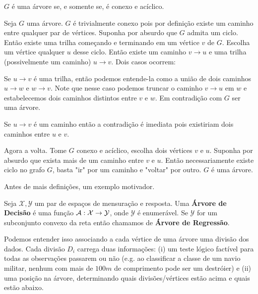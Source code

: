 \begin{teo}
$G$ é uma árvore se, e somente se, é conexo e acíclico.
\end{teo}


\begin{prova}

Seja $G$ uma árvore. $G$ é trivialmente conexo pois por definição existe um caminho entre qualquer par de vértices. Suponha por absurdo que $G$ admita um ciclo. Então existe uma trilha começando e terminando em um vértice $v$ de $G$. Escolha um vértice qualquer $u$ desse ciclo. Então existe um caminho $v \to u $ e uma trilha (possivelmente um caminho) $u \to v$. Dois casos ocorrem:

Se $u \to v$ é uma trilha, então podemos entende-la como a união de dois caminhos $u \to w$ e $w \to v$. Note que nesse caso podemos truncar o caminho $v \to u$ em $w$ e estabelecemos dois caminhos distintos entre $v$ e $w$. Em contradição com $G$ ser uma árvore.

Se $u \to v$ é um caminho então a contradição é imediata pois existiriam dois caminhos entre $u$ e $v$.

Agora a volta. Tome $G$ conexo e acíclico, escolha dois vértices $v$ e $u$. Suponha por absurdo que exista mais de um caminho entre $v$ e $u$. Então necessariamente existe ciclo no grafo $G$, basta "ir" por um caminho e "voltar" por outro. $G$ é uma árvore.
\blacksquare
\end{prova}

Antes de mais definições, um exemplo motivador.

\begin{defi}
Seja $\mathcal{X}, \mathcal{Y}$ um par de espaços de mensuração e resposta. Uma \textbf{Árvore de Decisão} é uma função $\mathcal{A}: \mathcal{X} \to \mathcal{Y}$, onde $\mathcal{Y}$ é enumerável. Se $\mathcal{Y}$ for um subconjunto convexo da reta então chamamos de \textbf{Árvore de Regressão}.
\end{defi}

Podemos entender isso associando a cada vértice de uma árvore uma divisão dos dados. Cada divisão $D_i$ carrega duas informações: (i) um teste lógico factível para todas as observações passarem ou não (e.g. ao classificar a classe de um navio militar, nenhum com mais de $100m$ de comprimento pode ser um destróier) e (ii) uma posição na árvore, determinando quais divisões/vértices estão acima e quais estão abaixo.


